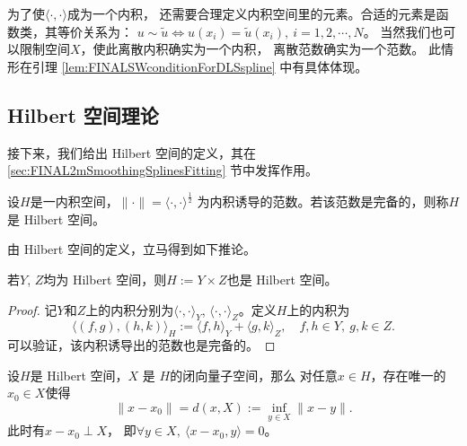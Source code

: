   为了使$\langle\cdot,\cdot\rangle$成为一个内积，
  还需要合理定义内积空间里的元素。合适的元素是函数类，其等价关系为：
  $u\sim \tilde{u} \Leftrightarrow
  u(x_{i})=\tilde{u}(x_{i}),\ i=1,2,\cdots,N$。
  当然我们也可以限制空间$X$，使此离散内积确实为一个内积，
  离散范数确实为一个范数。
  此情形在引理 \ref{lem:FINALSWconditionForDLSspline} 中有具体体现。

\subsection{Hilbert 空间理论}
\label{subsec:FINALHilbertspace}
  
  接下来，我们给出 Hilbert 空间的定义，其在
  \ref{sec:FINAL2mSmoothingSplinesFitting} 节中发挥作用。

  \begin{defn}[Hilbert 空间]
    \label{def:FINALHilbertSpace}
    设$H$是一内积空间，$\|\cdot\|= \langle \cdot,\cdot\rangle^{\frac{1}{2}}$
    为内积诱导的范数。若该范数是完备的，则称$H$是 Hilbert 空间。
  \end{defn}

  由 Hilbert 空间的定义，立马得到如下推论。
  \begin{coro}
    \label{coro:FINALtwoHilbertSpacesProduct}
    若$Y$, $Z$均为 Hilbert 空间，则$H:=Y\times Z$也是 Hilbert 空间。
  \end{coro}
  \begin{proof}
    记$Y$和$Z$上的内积分别为$\langle\cdot,\cdot\rangle_{Y}$,
    $\langle\cdot,\cdot\rangle_{Z}$。定义$H$上的内积为
    \begin{displaymath}
      \langle (f,g),(h,k)\rangle_{H}
      :=\langle f,h\rangle_{Y}
      +\langle g,k\rangle_{Z},
      \quad
      f,h\in Y,\ g,k\in Z.
    \end{displaymath}
    可以验证，该内积诱导出的范数也是完备的。
  \end{proof}

  \begin{thm}
    \label{thm:FINALProjectionOp}
    设$H$是 Hilbert 空间，$X$ 是 $H$的闭向量子空间，那么
    对任意$x\in H$，存在唯一的$x_{0}\in X$使得
    \begin{equation}
      \label{eq:FINALProjectionOp}
      \|x-x_{0}\|=d(x,X)
      :=\inf_{y\in X}\|x-y\|.
    \end{equation}
    此时有$x-x_{0}\perp X$，
    即$\forall y\in X,\ \langle x-x_{0},y\rangle=0$。
  \end{thm}

  
